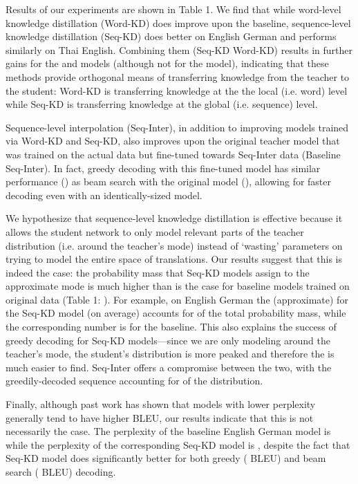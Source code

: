 \documentclass[11pt,letterpaper]{article}
\begin{document}
Results of our experiments are shown in Table 1. We find that while
word-level knowledge distillation (Word-KD) does improve upon the
baseline, sequence-level knowledge distillation (Seq-KD) does better
on English  German and performs similarly on Thai
 English. Combining them (Seq-KD  Word-KD) results in further gains
for the  and  models (although not for the  model),
indicating that these methods provide orthogonal means of transferring knowledge
from the teacher to the student: Word-KD is transferring knowledge at the
 the local (i.e. word) level while Seq-KD is transferring knowledge
at the global (i.e. sequence) level.

Sequence-level interpolation (Seq-Inter), in addition to improving models trained via
Word-KD and Seq-KD, 
also improves upon the original teacher model that was trained on the actual data
but fine-tuned towards Seq-Inter data (Baseline  Seq-Inter). 
In fact, greedy decoding with this fine-tuned model has similar
performance () as beam search with the original model (), allowing for faster
decoding even with an identically-sized model. 

We hypothesize that sequence-level knowledge distillation is effective because it allows the student network to only model
relevant parts of the teacher distribution (i.e. around the teacher's mode) instead of `wasting' parameters on trying to
model the entire space of translations.
Our results suggest that this is indeed the case: the probability mass that Seq-KD models assign to the approximate mode 
is much higher than is the case for baseline models trained on original data (Table 1: ). 
For example, on English  German the (approximate)  for the  Seq-KD model 
(on average) accounts for  of the total probability mass, while the corresponding number is  for the baseline. 
This also explains the success of 
greedy decoding for Seq-KD models---since we are only modeling around the teacher's mode, the student's distribution
is more peaked and therefore the  is much easier to find. Seq-Inter offers a compromise between the two, with
the greedily-decoded sequence accounting for  of the distribution.

Finally, although past work has shown that models with lower perplexity generally tend to have higher BLEU,
our results indicate that this is not necessarily the case. The perplexity of the baseline   English  German 
 model is  while the perplexity of the 
corresponding Seq-KD model is , despite the fact that Seq-KD model does significantly better for both greedy ( BLEU)
and beam search ( BLEU) decoding. 
\end{document}
